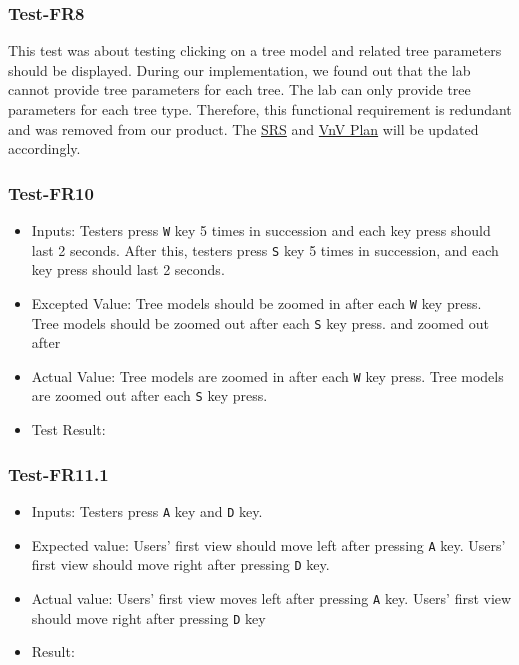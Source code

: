 \documentclass[12pt, titlepage]{article}
\begin{document}
\subsubsection{Test-FR8}
This test was about testing clicking on a tree model and related tree parameters 
should be displayed. During our implementation, we found out that the lab cannot 
provide tree parameters for each tree. The lab can only provide tree parameters for 
each tree type. Therefore, this functional requirement is redundant and was removed
from our product. The 
\href{https://github.com/wuj187/DigitalTwinCAS/blob/main/docs/SRS/SRS.pdf}{SRS}
and 
\href{https://github.com/wuj187/DigitalTwinCAS/blob/main/docs/VnVPlan/VnVPlan.pdf}
{VnV Plan} will be updated accordingly.

\subsubsection{Test-FR10}
\begin{itemize}
\item Inputs: Testers press \verb|W| key 5 times in succession 
and each key press should last 2 seconds.  After this, testers press \verb|S|
key 5 times in succession, and each key press should last 2 seconds. 
\item Excepted Value: Tree models should be zoomed in after each \verb|W| key press.
Tree models should be zoomed out after each \verb|S| key press.
and zoomed out after 
\item Actual Value: Tree models are zoomed in after each \verb|W| key press.
Tree models are zoomed out after each \verb|S| key press.
\item Test Result: \pass
\end{itemize}

\subsubsection{Test-FR11.1}
\begin{itemize}
    \item Inputs: Testers press \verb|A| key and \verb|D| key.
    \item Expected value: Users’ first view should move left after pressing \verb|A|
    key. Users’ first view should move right after pressing \verb|D| key.
    \item Actual value: Users’ first view moves left after pressing \verb|A| key. Users’ first view should move
right after pressing \verb|D| key
    \item Result: \pass
\end{itemize}
\end{document}
